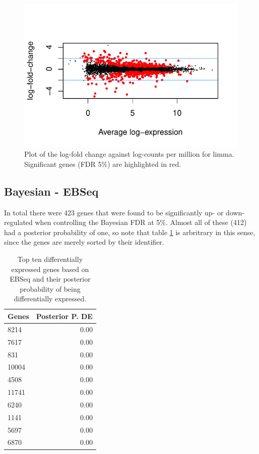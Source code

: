 \documentclass[a4paper,10pt]{article}\usepackage[]{graphicx}\usepackage[]{color}
\makeatletter
\def\maxwidth{ %
  \ifdim\Gin@nat@width>\linewidth
    \linewidth
  \else
    \Gin@nat@width
  \fi
}
\newenvironment{knitrout}{}{} %
\makeatother
\begin{document}
\begin{figure}[H]
\centering
\begin{knitrout}
\color{fgcolor}

{\centering \includegraphics[width=\maxwidth]{figures/plots-voom-de-plot-1} 

}



\end{knitrout}
\caption{Plot of the log-fold change against log-counts per million for limma. Significant genes (FDR 5\%) are highlighted in red.}
\label{limma-de-plot}
\end{figure}

\subsection{Bayesian - EBSeq}


In total there were 423 genes that were found to be significantly up- or down-regulated when controlling the Bayesian FDR at 5\%. Almost all of these (412) had a posterior probability of one, so note that table \ref{EBSeq-top} is arbritrary in this sense, since the genes are merely sorted by their identifier.

\begin{table}[H]
\centering
\caption{Top ten differentially expressed genes
                            based on EBSeq and their posterior probability of being differentially expressed.} 
\label{EBSeq-top}
\begin{tabular}{lr}
  \hline
Genes & Posterior P. DE \\ 
  \hline
8214 & 0.00 \\ 
  7617 & 0.00 \\ 
  831 & 0.00 \\ 
  10004 & 0.00 \\ 
  4508 & 0.00 \\ 
  11741 & 0.00 \\ 
  6240 & 0.00 \\ 
  1141 & 0.00 \\ 
  5697 & 0.00 \\ 
  6870 & 0.00 \\ 
   \hline
\end{tabular}
\end{table}
\end{document}
